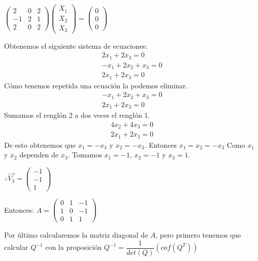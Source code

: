 \documentclass[letterpaper]{article}
\renewcommand{\*}{\cdot}
\theoremstyle{definition}
\begin{document}
	\begin{center}
		$\begin{pmatrix} 2 & 0 & 2 \\ -1 & 2 & 1 \\ 2 & 0 & 2  \end{pmatrix} \begin{pmatrix} X_{1} \\ X_{2} \\ X_{3} \end{pmatrix} = \begin{pmatrix} 0 \\ 0 \\ 0 \end{pmatrix}$
	\end{center}
	Obtenemos el siguiente sistema de ecuaciones:
	\begin{align*}
	2x_{1} + 2x_{3} = 0\\
	-x_{1} +2x_{2} + x_{3}= 0\\
	2x_{1}+2x_{3}= 0
	\end{align*}
	Cómo tenemos repetida una ecuación la podemos eliminar.
	\begin{align*}
	-x_{1} +2x_{2} + x_{3}= 0\\
	2x_{1}+2x_{3}= 0
	\end{align*}
	Sumamos el renglón 2 a dos veces el renglón 1.
	\begin{align*}
	4x_{2} + 4x_{3}= 0\\
	2x_{1}+2x_{3}= 0
	\end{align*}
	De esto obtenemos que $x_{1} = -x_{3}$ y $x_{2}= -x_{3}$. Entonces $x_{1}=x_{2}=-x_{3}$ Como $x_{1}$ y $x_{2}$ dependen de $x_{3}$. Tomamos $x_{1} = -1$, $x_{2}=-1$ y $x_{3}=1$.
	\begin{center}
		$\therefore \vec{V_{3}} = \begin{pmatrix} -1 \\ -1 \\ 1 \end{pmatrix}$
	\end{center}
	\begin{center}
		Entonces: $A = \begin{pmatrix}	0 & 1 & -1 \\ 1 & 0 & -1 \\ 0 & 1 & 1 \end{pmatrix}$
	\end{center}
	Por último calcularemos la matriz diagonal de $A$, pero primero tenemos que calcular $Q^{-1}$ con la proposición $Q^{-1}= \dfrac{1}{det(Q)}(cof(Q^{T}))$\\
\end{document}

